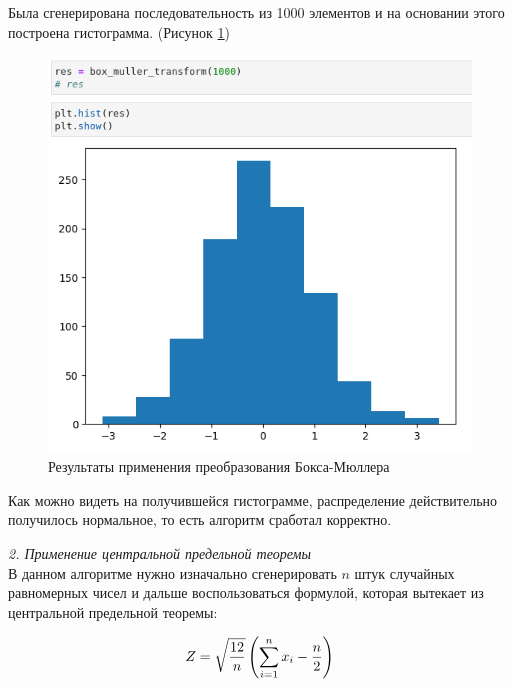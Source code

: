 \documentclass[14pt,fleqn]{extarticle}
\begin{document}
	\newpage
	Была сгенерирована последовательность из 1000 элементов и на основании этого построена гистограмма. (Рисунок \ref{fig:box_muller_transform_result})

	\begin{figure}[h]
		\centering \includegraphics[scale=0.6]{box_muller_transform_result}
		\caption{Результаты применения преобразования Бокса-Мюллера}
		\label{fig:box_muller_transform_result}
	\end{figure}
	
	Как можно видеть на получившейся гистограмме, распределение действительно получилось нормальное, то есть алгоритм сработал корректно.
	
	\vspace{1cm}
	
	\textit{2. Применение центральной предельной теоремы}\\
	
	В данном алгоритме нужно изначально сгенерировать $n$ штук случайных равномерных чисел и дальше воспользоваться формулой, которая вытекает из центральной предельной теоремы:
	\begin{ceqn}
	\begin{align*}
		Z = \sqrt{\dfrac{12}{n}}\left(\smashoperator[r]{\sum_{i=1}^{n}} x_i - \dfrac{n}{2}\right)
	\end{align*}
	\end{ceqn}
\end{document}
